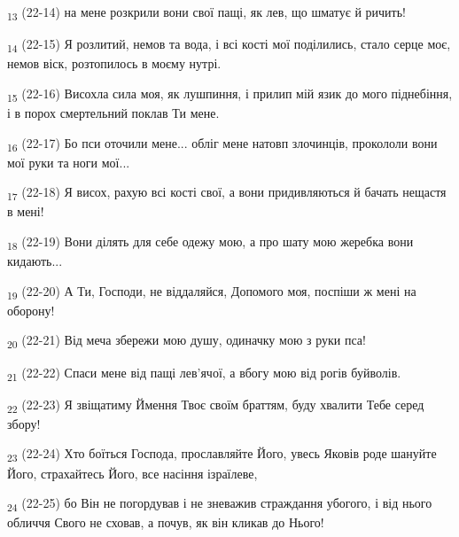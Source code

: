 \begin{tcolorbox}
\textsubscript{13} (22-14) на мене розкрили вони свої пащі, як лев, що шматує й ричить!
\end{tcolorbox}
\begin{tcolorbox}
\textsubscript{14} (22-15) Я розлитий, немов та вода, і всі кості мої поділились, стало серце моє, немов віск, розтопилось в моєму нутрі.
\end{tcolorbox}
\begin{tcolorbox}
\textsubscript{15} (22-16) Висохла сила моя, як лушпиння, і прилип мій язик до мого піднебіння, і в порох смертельний поклав Ти мене.
\end{tcolorbox}
\begin{tcolorbox}
\textsubscript{16} (22-17) Бо пси оточили мене... обліг мене натовп злочинців, прокололи вони мої руки та ноги мої...
\end{tcolorbox}
\begin{tcolorbox}
\textsubscript{17} (22-18) Я висох, рахую всі кості свої, а вони придивляються й бачать нещастя в мені!
\end{tcolorbox}
\begin{tcolorbox}
\textsubscript{18} (22-19) Вони ділять для себе одежу мою, а про шату мою жеребка вони кидають...
\end{tcolorbox}
\begin{tcolorbox}
\textsubscript{19} (22-20) А Ти, Господи, не віддаляйся, Допомого моя, поспіши ж мені на оборону!
\end{tcolorbox}
\begin{tcolorbox}
\textsubscript{20} (22-21) Від меча збережи мою душу, одиначку мою з руки пса!
\end{tcolorbox}
\begin{tcolorbox}
\textsubscript{21} (22-22) Спаси мене від пащі лев'ячої, а вбогу мою від рогів буйволів.
\end{tcolorbox}
\begin{tcolorbox}
\textsubscript{22} (22-23) Я звіщатиму Ймення Твоє своїм браттям, буду хвалити Тебе серед збору!
\end{tcolorbox}
\begin{tcolorbox}
\textsubscript{23} (22-24) Хто боїться Господа, прославляйте Його, увесь Яковів роде шануйте Його, страхайтесь Його, все насіння ізраїлеве,
\end{tcolorbox}
\begin{tcolorbox}
\textsubscript{24} (22-25) бо Він не погордував і не зневажив страждання убогого, і від нього обличчя Свого не сховав, а почув, як він кликав до Нього!
\end{tcolorbox}
